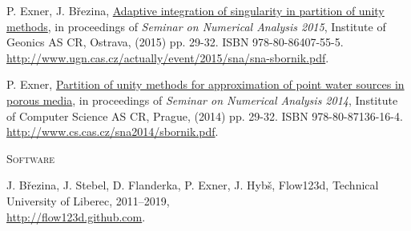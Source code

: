 \documentclass[bibliography=totocnumbered,dvipsnames,FM,Dis, EN]{tulthesis_autoreferat}
\begin{document}
\begin{itemize}[label={}, leftmargin=*]
{\item
P. Exner, J. B{\v r}ezina, \href{http://www.ugn.cas.cz/actually/event/2015/sna/sna-sbornik.pdf}{Adaptive integration of singularity in partition of unity methods},
in proceedings of \emph{Seminar on Numerical Analysis 2015}, Institute of Geonics AS CR, Ostrava, (2015) pp. 29-32. ISBN 978-80-86407-55-5. \\
\url{http://www.ugn.cas.cz/actually/event/2015/sna/sna-sbornik.pdf}.

\item
P. Exner, \href{http://www.cs.cas.cz/sna2014/sbornik.pdf}{Partition of unity methods for approximation of point water sources in porous media},
in proceedings of \emph{Seminar on Numerical Analysis 2014}, Institute of Computer Science AS CR, Prague, (2014) pp. 29-32. ISBN 978-80-87136-16-4.\\
\url{http://www.cs.cas.cz/sna2014/sbornik.pdf}.
}
\end{itemize}
%
\pagebreak
%
{\noindent\large\textsc{Software}}
\begin{itemize}[label={}, leftmargin=*]
{\small
\item
J. B{\v r}ezina, J. Stebel, D. Flanderka, P. Exner, J. Hyb{\v s}, Flow123d, 
Technical University of Liberec, 2011--2019, \\
\href{http://flow123d.github.com}{http://flow123d.github.com}.
}
\end{itemize}
\end{document}

